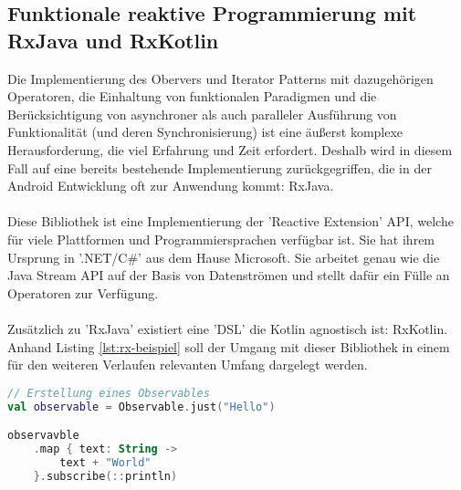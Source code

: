 \subsection{Funktionale reaktive Programmierung mit RxJava und RxKotlin}
Die Implementierung des Obervers und Iterator Patterns mit dazugehörigen Operatoren, die Einhaltung von funktionalen Paradigmen und die Berücksichtigung von asynchroner als auch paralleler Ausführung von Funktionalität (und deren Synchronisierung) ist eine äußerst komplexe Herausforderung, die viel Erfahrung und Zeit erfordert. Deshalb wird in diesem Fall auf eine bereits bestehende Implementierung zurückgegriffen, die in der Android Entwicklung oft zur Anwendung kommt: RxJava.
\\\\
Diese Bibliothek ist eine Implementierung der 'Reactive Extension' API, welche für viele Plattformen und Programmiersprachen verfügbar ist. Sie hat ihrem Ursprung in '.NET/C\#' aus dem Hause Microsoft. Sie arbeitet genau wie die Java Stream API auf der Basis von Datenströmen und stellt dafür ein Fülle an Operatoren zur Verfügung.
\\\\
Zusätzlich zu 'RxJava' existiert eine 'DSL' die Kotlin agnostisch ist: RxKotlin.
Anhand Listing
\ref{lst:rx-beispiel}
soll der Umgang mit dieser Bibliothek in einem für den weiteren Verlaufen relevanten Umfang dargelegt werden.
\begin{lstlisting}[caption={'RxJava/Kotlin Beispiel}, label={lst:rx-beispiel}, language=Kotlin]
// Erstellung eines Observables
val observable = Observable.just("Hello")

observavble
	.map { text: String ->
		text + "World"
	}.subscribe(::println)
\end{lstlisting}

